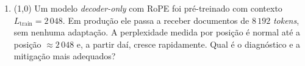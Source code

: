 \documentclass[11pt,a4paper]{article}
\begin{document}
\begin{enumerate}[1)]
\begin{enumerate}[a)]
    \item $[\,0.455,\;0.276,\;0.167,\;0.102\,]$
    \item $[\,0.000,\;0.000,\;0.000,\;1.000\,]$
    \item $[\,0.644,\;0.237,\;0.087,\;0.032\,]$
    \item $[\,0.350,\;0.273,\;0.212,\;0.165\,]$
    \item $[\,0.500,\;0.333,\;0.167,\;0.000\,]$
    \item $[\,0.250,\;0.250,\;0.250,\;0.250\,]$
    \item $[\,0.102,\;0.167,\;0.276,\;0.455\,]$
    \item $[\,0.400,\;0.300,\;0.200,\;0.100\,]$
\end{enumerate}

\pagebreak
\item (1{,}0) Um modelo \textit{decoder-only} com RoPE foi pré-treinado com contexto $L_\text{train} = 2\,048$. Em produção ele passa a receber documentos de $8\,192$ \textit{tokens}, sem nenhuma adaptação. A perplexidade medida por posição é normal até a posição $\approx 2\,048$ e, a partir daí, cresce rapidamente. Qual é o diagnóstico e a mitigação mais adequados?


\end{enumerate}
\end{document}
